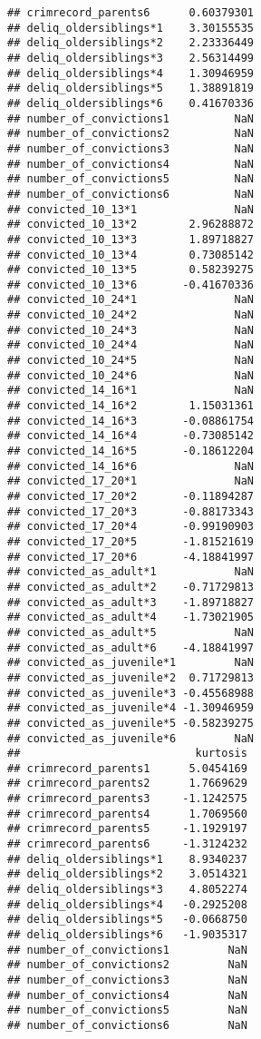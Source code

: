 \documentclass[]{tufte-handout}
\begin{document}
\begin{verbatim}
## crimrecord_parents6      0.60379301
## deliq_oldersiblings*1    3.30155535
## deliq_oldersiblings*2    2.23336449
## deliq_oldersiblings*3    2.56314499
## deliq_oldersiblings*4    1.30946959
## deliq_oldersiblings*5    1.38891819
## deliq_oldersiblings*6    0.41670336
## number_of_convictions1          NaN
## number_of_convictions2          NaN
## number_of_convictions3          NaN
## number_of_convictions4          NaN
## number_of_convictions5          NaN
## number_of_convictions6          NaN
## convicted_10_13*1               NaN
## convicted_10_13*2        2.96288872
## convicted_10_13*3        1.89718827
## convicted_10_13*4        0.73085142
## convicted_10_13*5        0.58239275
## convicted_10_13*6       -0.41670336
## convicted_10_24*1               NaN
## convicted_10_24*2               NaN
## convicted_10_24*3               NaN
## convicted_10_24*4               NaN
## convicted_10_24*5               NaN
## convicted_10_24*6               NaN
## convicted_14_16*1               NaN
## convicted_14_16*2        1.15031361
## convicted_14_16*3       -0.08861754
## convicted_14_16*4       -0.73085142
## convicted_14_16*5       -0.18612204
## convicted_14_16*6               NaN
## convicted_17_20*1               NaN
## convicted_17_20*2       -0.11894287
## convicted_17_20*3       -0.88173343
## convicted_17_20*4       -0.99190903
## convicted_17_20*5       -1.81521619
## convicted_17_20*6       -4.18841997
## convicted_as_adult*1            NaN
## convicted_as_adult*2    -0.71729813
## convicted_as_adult*3    -1.89718827
## convicted_as_adult*4    -1.73021905
## convicted_as_adult*5            NaN
## convicted_as_adult*6    -4.18841997
## convicted_as_juvenile*1         NaN
## convicted_as_juvenile*2  0.71729813
## convicted_as_juvenile*3 -0.45568988
## convicted_as_juvenile*4 -1.30946959
## convicted_as_juvenile*5 -0.58239275
## convicted_as_juvenile*6         NaN
##                           kurtosis
## crimrecord_parents1      5.0454169
## crimrecord_parents2      1.7669629
## crimrecord_parents3     -1.1242575
## crimrecord_parents4      1.7069560
## crimrecord_parents5     -1.1929197
## crimrecord_parents6     -1.3124232
## deliq_oldersiblings*1    8.9340237
## deliq_oldersiblings*2    3.0514321
## deliq_oldersiblings*3    4.8052274
## deliq_oldersiblings*4   -0.2925208
## deliq_oldersiblings*5   -0.0668750
## deliq_oldersiblings*6   -1.9035317
## number_of_convictions1         NaN
## number_of_convictions2         NaN
## number_of_convictions3         NaN
## number_of_convictions4         NaN
## number_of_convictions5         NaN
## number_of_convictions6         NaN

\end{verbatim}
\end{document}
